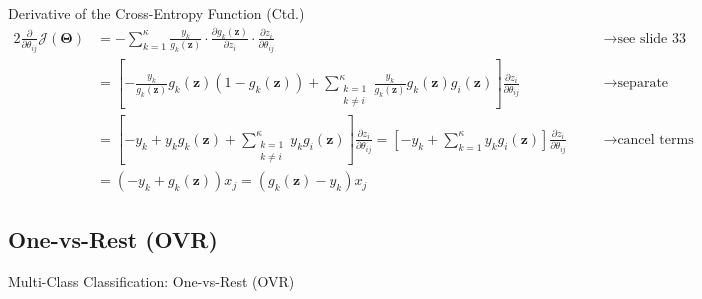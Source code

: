 \begin{frame}{Derivative of the Cross-Entropy Function (Ctd.)}{}\optional
	\footnotesize
	\begin{alignat*}{2}
		\frac{\partial}{\partial \theta_{ij}} \mathcal{J}(\bm{\Theta})	
			&= 	-\sum_{k=1}^{\kappa} \frac{y_k}{g_k(\bm{z})} \cdot \frac{\partial g_k(\bm{z})}{\partial z_i} \cdot \frac{\partial z_i}{\partial \theta_{ij}}
			&&	\quad\longrightarrow \text{see slide 33}															\\[2mm]
			&= 	\left[ -\frac{y_k}{g_k(\bm{z})} g_k(\bm{z}) (1 - g_k(\bm{z})) +
				\sum_{\substack{k=1 \\ k \ne i}}^{\kappa} \frac{y_k}{g_k(\bm{z})} g_k(\bm{z}) g_i(\bm{z}) \right] 
				\frac{\partial z_i}{\partial \theta_{ij}}
			&&	\quad\longrightarrow \text{separate cases} 															\\[2mm]
			&= 	\left[ -y_k + y_k g_k(\bm{z}) + \sum_{\substack{k=1 \\ k \ne i}}^{\kappa} y_k g_i(\bm{z}) \right]
				\frac{\partial z_i}{\partial \theta_{ij}} = 
				\left[ -y_k + \sum_{k=1}^{\kappa}  y_k g_i(\bm{z}) \right] \frac{\partial z_i}{\partial \theta_{ij}} 					
			&&	\quad\longrightarrow \text{cancel terms}\\[2mm]
			&=	(-y_k + g_k(\bm{z})) x_j = \boxed{(g_k(\bm{z}) - y_k) x_j}
	\end{alignat*}
\end{frame}


\subsection{One-vs-Rest (OVR)}

\begin{frame}{Multi-Class Classification: One-vs-Rest (OVR)}{}
\end{frame}


